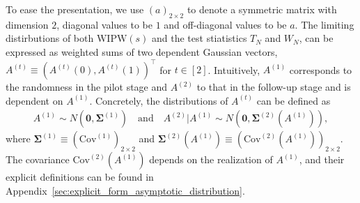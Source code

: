 \documentclass[12pt]{article}
\newcommand{\WIPW}{\mathrm{WIPW}}
\begin{document}
To ease the presentation, we use $(a)_{2\times 2}$ to denote a symmetric matrix with dimension $2$, diagonal values to be $1$ and off-diagonal values to be $a$. The limiting distirbutions of both $\WIPW(s)$ and the test stiatistics $T_N$ and $W_N$, 
can be expressed as weighted sums of two dependent Gaussian vectors, $A^{(t)}\equiv (A^{(t)}(0), A^{(t)}(1))^\top$ for $t\in[2]$. Intuitively, $A^{(1)}$ corresponds to the randomness in the pilot stage 
and $A^{(2)}$ to that in the follow-up stage and is dependent on $A^{(1)}$. 
Concretely, the distributions of $A^{(t)}$ can be defined as
\begin{align*}
	A^{(1)} \sim N(\bm 0, \bm \Sigma^{(1)})\quad\text{and}\quad A^{(2)}|A^{(1)} \sim N(\bm 0, \bm \Sigma^{(2)}(A^{(1)})),
\end{align*} 
where $\bm\Sigma^{(1)}\equiv (\mathrm{Cov}^{(1)})_{2\times 2}$ and $\bm \Sigma^{(2)}(A^{(1)})\equiv (\mathrm{Cov}^{(2)}(A^{(1)}))_{2\times 2}$. The covariance $\mathrm{Cov}^{(2)}(A^{(1)})$ depends on the realization of $A^{(1)}$, and their explicit definitions can be found in Appendix~\ref{sec:explicit_form_asymptotic_distribution}.
\end{document}
